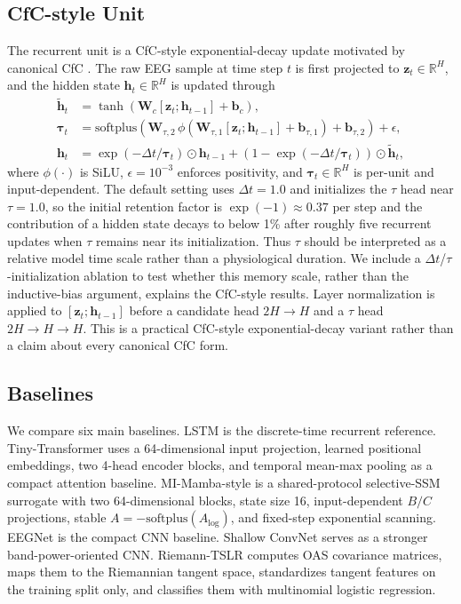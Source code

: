 \documentclass[journal]{IEEEtran}
\begin{document}
\subsection{CfC-style Unit}
The recurrent unit is a CfC-style exponential-decay update motivated by canonical CfC \cite{hasani2022cfc}. The raw EEG sample at time step $t$ is first projected to $\mathbf{z}_t \in \mathbb{R}^{H}$, and the hidden state $\mathbf{h}_t \in \mathbb{R}^{H}$ is updated through
\begin{align}
\tilde{\mathbf{h}}_t &= \tanh\!\left(\mathbf{W}_c[\mathbf{z}_t; \mathbf{h}_{t-1}] + \mathbf{b}_c\right), \\
\boldsymbol{\tau}_t &= \mathrm{softplus}\!\left(\mathbf{W}_{\tau,2}\,\phi\!\left(\mathbf{W}_{\tau,1}[\mathbf{z}_t; \mathbf{h}_{t-1}] + \mathbf{b}_{\tau,1}\right) + \mathbf{b}_{\tau,2}\right) + \epsilon, \\
\mathbf{h}_t &= \exp(-\Delta t / \boldsymbol{\tau}_t) \odot \mathbf{h}_{t-1}
+ \left(1 - \exp(-\Delta t / \boldsymbol{\tau}_t)\right) \odot \tilde{\mathbf{h}}_t ,
\end{align}
where $\phi(\cdot)$ is SiLU, $\epsilon = 10^{-3}$ enforces positivity, and $\boldsymbol{\tau}_t \in \mathbb{R}^{H}$ is per-unit and input-dependent. The default setting uses $\Delta t = 1.0$ and initializes the $\tau$ head near $\tau=1.0$, so the initial retention factor is $\exp(-1)\approx0.37$ per step and the contribution of a hidden state decays to below 1\% after roughly five recurrent updates when $\tau$ remains near its initialization. Thus $\tau$ should be interpreted as a relative model time scale rather than a physiological duration. We include a $\Delta t$/$\tau$-initialization ablation to test whether this memory scale, rather than the inductive-bias argument, explains the CfC-style results. Layer normalization is applied to $[\mathbf{z}_t; \mathbf{h}_{t-1}]$ before a candidate head $2H \rightarrow H$ and a $\tau$ head $2H \rightarrow H \rightarrow H$. This is a practical CfC-style exponential-decay variant rather than a claim about every canonical CfC form.

\subsection{Baselines}
We compare six main baselines. LSTM \cite{hochreiter1997long} is the discrete-time recurrent reference. Tiny-Transformer uses a 64-dimensional input projection, learned positional embeddings, two 4-head encoder blocks, and temporal mean-max pooling as a compact attention baseline. MI-Mamba-style is a shared-protocol selective-SSM surrogate with two 64-dimensional blocks, state size 16, input-dependent $B/C$ projections, stable $A=-\mathrm{softplus}(A_{\log})$, and fixed-step exponential scanning. EEGNet \cite{lawhern2018eegnet} is the compact CNN baseline. Shallow ConvNet \cite{schirrmeister2017deep} serves as a stronger band-power-oriented CNN. Riemann-TSLR computes OAS covariance matrices, maps them to the Riemannian tangent space, standardizes tangent features on the training split only, and classifies them with multinomial logistic regression.
\end{document}
